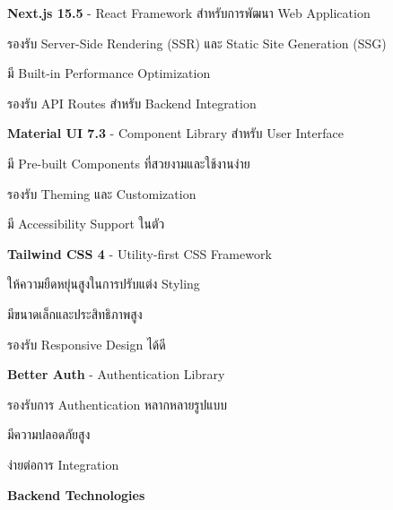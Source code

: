 \begin{mycustomenum2}
    \item \textbf{Next.js 15.5} - React Framework สำหรับการพัฒนา Web Application
    \begin{mycustomenum2}
        \item รองรับ Server-Side Rendering (SSR) และ Static Site Generation (SSG)
        \item มี Built-in Performance Optimization
        \item รองรับ API Routes สำหรับ Backend Integration
    \end{mycustomenum2}

    \item \textbf{Material UI 7.3} - Component Library สำหรับ User Interface
    \begin{mycustomenum2}
        \item มี Pre-built Components ที่สวยงามและใช้งานง่าย
        \item รองรับ Theming และ Customization
        \item มี Accessibility Support ในตัว
    \end{mycustomenum2}

    \item \textbf{Tailwind CSS 4} - Utility-first CSS Framework
    \begin{mycustomenum2}
        \item ให้ความยืดหยุ่นสูงในการปรับแต่ง Styling
        \item มีขนาดเล็กและประสิทธิภาพสูง
        \item รองรับ Responsive Design ได้ดี
    \end{mycustomenum2}

    \item \textbf{Better Auth} - Authentication Library
    \begin{mycustomenum2}
        \item รองรับการ Authentication หลากหลายรูปแบบ
        \item มีความปลอดภัยสูง
        \item ง่ายต่อการ Integration
    \end{mycustomenum2}
\end{mycustomenum2}

\vspace{0.5em}
\textbf{Backend Technologies}
\vspace{0.5em}


